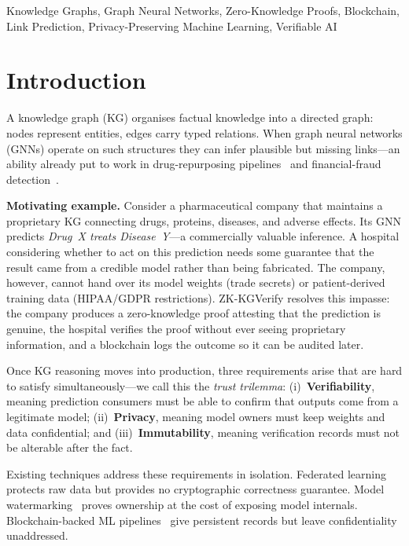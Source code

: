 \documentclass[conference, 10pt]{IEEEtran}
\begin{document}
\begin{IEEEkeywords}
Knowledge Graphs, Graph Neural Networks, Zero-Knowledge Proofs, Blockchain, Link Prediction, Privacy-Preserving Machine Learning, Verifiable AI
\end{IEEEkeywords}

\section{Introduction}
\label{sec:introduction}

A knowledge graph (KG) organises factual knowledge into a directed graph: nodes represent entities, edges carry typed relations. When graph neural networks (GNNs) operate on such structures they can infer plausible but missing links---an ability already put to work in drug-repurposing pipelines~\cite{zitnik2018modeling} and financial-fraud detection~\cite{weber2019anti}.

\textbf{Motivating example.} Consider a pharmaceutical company that maintains a proprietary KG connecting drugs, proteins, diseases, and adverse effects. Its GNN predicts \emph{Drug~X treats Disease~Y}---a commercially valuable inference. A hospital considering whether to act on this prediction needs some guarantee that the result came from a credible model rather than being fabricated. The company, however, cannot hand over its model weights (trade secrets) or patient-derived training data (HIPAA/GDPR restrictions). ZK-KGVerify resolves this impasse: the company produces a zero-knowledge proof attesting that the prediction is genuine, the hospital verifies the proof without ever seeing proprietary information, and a blockchain logs the outcome so it can be audited later.

Once KG reasoning moves into production, three requirements arise that are hard to satisfy simultaneously---we call this the \emph{trust trilemma}: (i)~\textbf{Verifiability}, meaning prediction consumers must be able to confirm that outputs come from a legitimate model; (ii)~\textbf{Privacy}, meaning model owners must keep weights and data confidential; and (iii)~\textbf{Immutability}, meaning verification records must not be alterable after the fact.

Existing techniques address these requirements in isolation. Federated learning~\cite{mcmahan2017communication} protects raw data but provides no cryptographic correctness guarantee. Model watermarking~\cite{adi2018turning} proves ownership at the cost of exposing model internals. Blockchain-backed ML pipelines~\cite{kurtulmus2018trustless} give persistent records but leave confidentiality unaddressed.
\end{document}
